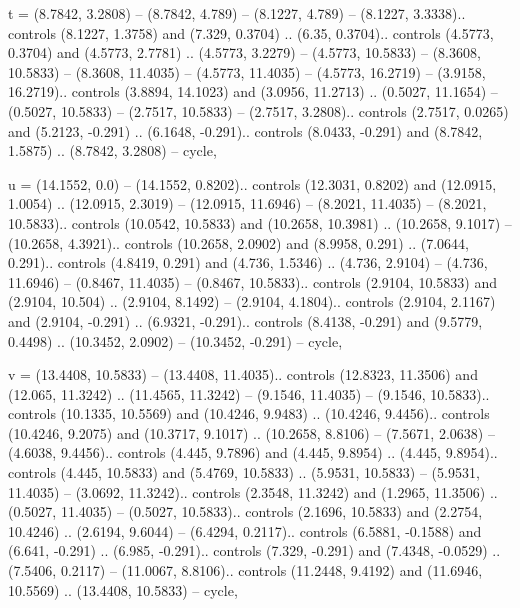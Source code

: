 t = {(8.7842, 3.2808) -- (8.7842, 4.789) -- (8.1227, 4.789) -- (8.1227, 3.3338).. controls (8.1227, 1.3758) and (7.329, 0.3704) .. (6.35, 0.3704).. controls (4.5773, 0.3704) and (4.5773, 2.7781) .. (4.5773, 3.2279) -- (4.5773, 10.5833) -- (8.3608, 10.5833) -- (8.3608, 11.4035) -- (4.5773, 11.4035) -- (4.5773, 16.2719) -- (3.9158, 16.2719).. controls (3.8894, 14.1023) and (3.0956, 11.2713) .. (0.5027, 11.1654) -- (0.5027, 10.5833) -- (2.7517, 10.5833) -- (2.7517, 3.2808).. controls (2.7517, 0.0265) and (5.2123, -0.291) .. (6.1648, -0.291).. controls (8.0433, -0.291) and (8.7842, 1.5875) .. (8.7842, 3.2808) -- cycle},

u = {(14.1552, 0.0) -- (14.1552, 0.8202).. controls (12.3031, 0.8202) and (12.0915, 1.0054) .. (12.0915, 2.3019) -- (12.0915, 11.6946) -- (8.2021, 11.4035) -- (8.2021, 10.5833).. controls (10.0542, 10.5833) and (10.2658, 10.3981) .. (10.2658, 9.1017) -- (10.2658, 4.3921).. controls (10.2658, 2.0902) and (8.9958, 0.291) .. (7.0644, 0.291).. controls (4.8419, 0.291) and (4.736, 1.5346) .. (4.736, 2.9104) -- (4.736, 11.6946) -- (0.8467, 11.4035) -- (0.8467, 10.5833).. controls (2.9104, 10.5833) and (2.9104, 10.504) .. (2.9104, 8.1492) -- (2.9104, 4.1804).. controls (2.9104, 2.1167) and (2.9104, -0.291) .. (6.9321, -0.291).. controls (8.4138, -0.291) and (9.5779, 0.4498) .. (10.3452, 2.0902) -- (10.3452, -0.291) -- cycle},

v = {(13.4408, 10.5833) -- (13.4408, 11.4035).. controls (12.8323, 11.3506) and (12.065, 11.3242) .. (11.4565, 11.3242) -- (9.1546, 11.4035) -- (9.1546, 10.5833).. controls (10.1335, 10.5569) and (10.4246, 9.9483) .. (10.4246, 9.4456).. controls (10.4246, 9.2075) and (10.3717, 9.1017) .. (10.2658, 8.8106) -- (7.5671, 2.0638) -- (4.6038, 9.4456).. controls (4.445, 9.7896) and (4.445, 9.8954) .. (4.445, 9.8954).. controls (4.445, 10.5833) and (5.4769, 10.5833) .. (5.9531, 10.5833) -- (5.9531, 11.4035) -- (3.0692, 11.3242).. controls (2.3548, 11.3242) and (1.2965, 11.3506) .. (0.5027, 11.4035) -- (0.5027, 10.5833).. controls (2.1696, 10.5833) and (2.2754, 10.4246) .. (2.6194, 9.6044) -- (6.4294, 0.2117).. controls (6.5881, -0.1588) and (6.641, -0.291) .. (6.985, -0.291).. controls (7.329, -0.291) and (7.4348, -0.0529) .. (7.5406, 0.2117) -- (11.0067, 8.8106).. controls (11.2448, 9.4192) and (11.6946, 10.5569) .. (13.4408, 10.5833) -- cycle},

